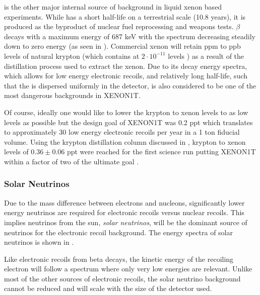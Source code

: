 \krypton{} is the other major internal source of background in liquid xenon based experiments.  While \krypton{} has a short half-life on a terrestrial scale (10.8 years), it is produced as the byproduct of nuclear fuel reprocessing and weapons tests.  \krypton{} $\beta$ decays with a maximum energy of 687 keV with the spectrum decreasing steadily down to zero energy (as seen in ).  Commercial xenon will retain ppm to ppb levels of natural krypton (which contains \krypton{} at $2 \cdot 10^{-11}$ levels \cite{du2004atom}) as a result of the distillation process used to extract the xenon.  Due to its decay energy spectra, which allows for low energy electronic recoils, and relatively long half-life, such that the \krypton{} is dispersed uniformly in the detector, \krypton{} is also considered to be one of the most dangerous backgrounds in XENON1T.  

Of course, ideally one would like to lower the krypton to xenon levels to as low levels as possible but the design goal of XENON1T was 0.2 ppt which translates to approximately 30 low energy electronic recoils per year in a 1 ton fiducial volume.  Using the krypton distillation column discussed in , krypton to xenon levels of $0.36 \pm 0.06$ ppt were reached for the first science run putting XENON1T within a factor of two of the ultimate goal \cite{aprile2017xenon1t}.


\subsubsection{Solar Neutrinos}
\label{sec:xe1t_er_bkg_neutrinos}

Due to the mass difference between electrons and nucleons, significantly lower energy neutrinos are required for electronic recoils versus nuclear recoils.  This implies neutrinos from the sun, \textit{solar neutrinos}, will be the dominant source of neutrinos for the electronic recoil background.  The energy spectra of solar neutrinos is shown in .  

Like electronic recoils from beta decays, the kinetic energy of the recoiling electron will follow a spectrum where only very low energies are relevant.  Unlike most of the other sources of electronic recoils, the solar neutrino background cannot be reduced and will scale with the size of the detector used.


\subsubsection{\radioxenon}
\label{sec:xe1t_radioxenon}

